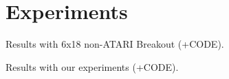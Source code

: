 \section{Experiments}
\label{subsec:experiments}
Results with 6x18 non-ATARI Breakout (+CODE).

Results with our experiments (+CODE).
